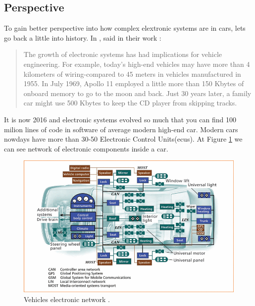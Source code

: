 \subsection{Perspective} %
\label{sub:perspective}
To gain better perspective into how complex elextronic systems are in cars, lets go back a little into history. In \citeyear{976923}, \citeauthor{976923} said in their work :
\blockquote[\cite{976923}]{The growth of electronic systems has had implications for vehicle engineering. For example, today's high-end vehicles may have more than 4 kilometers of wiring-compared to 45 meters in vehicles manufactured in 1955. In July 1969, Apollo 11 employed a little more than 150 Kbytes of onboard memory to go to the moon and back. Just 30 years later, a family car might use 500 Kbytes to keep the CD player from skipping tracks.}
It is now 2016 and electronic systems evolved so much that you can find 100 milion lines of code in software of average modern high-end car\cite{lines_of_code}. Modern cars nowdays have more than 30-50 Electronic Control Units(\glspl{ecu}). At Figure \ref{fig:car_system} we can see network of electronic components inside a car.
\begin{figure}[H]
\begin{center}
\captionsetup{font=small}
\includegraphics[scale=0.5]{pics/car_system.png}
\caption{Vehicles electronic network \cite{976923}.}
\label{fig:car_system}
\end{center}
\end{figure}
